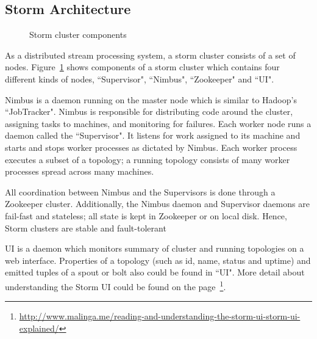 \subsection{Storm Architecture}
\begin{figure}
  \begin{center}
   \caption{Storm cluster components}
   \label{fig:storm_cluster}
  \end{center}
\end{figure}

As a distributed stream processing system, a storm cluster consists of a set of nodes. Figure~\ref{fig:storm_cluster} shows components of a storm cluster which contains four different kinds of nodes, ``Supervisor", ``Nimbus", ``Zookeeper" and ``UI". 

Nimbus is a daemon running on the master node which is similar to Hadoop's ``JobTracker". Nimbus is responsible for distributing code around the cluster, assigning tasks to machines, and monitoring for failures. Each worker node runs a daemon called the ``Supervisor". It listens for work assigned to its machine and starts and stops worker processes as dictated by Nimbus. Each worker process executes a subset of a topology; a running topology consists of many worker processes spread across many machines.

All coordination between Nimbus and the Supervisors is done through a Zookeeper cluster. Additionally, the Nimbus daemon and Supervisor daemons are fail-fast and stateless; all state is kept in Zookeeper or on local disk. Hence, Storm clusters are stable and fault-tolerant

UI is a daemon which monitors summary of cluster and running topologies on a web interface. Properties of a topology (such as id, name, status and uptime) and emitted tuples of a spout or bolt also could be found in ``UI". More detail about understanding the Storm UI could be found on the page~\footnote{\url{http://www.malinga.me/reading-and-understanding-the-storm-ui-storm-ui-explained/}}.


